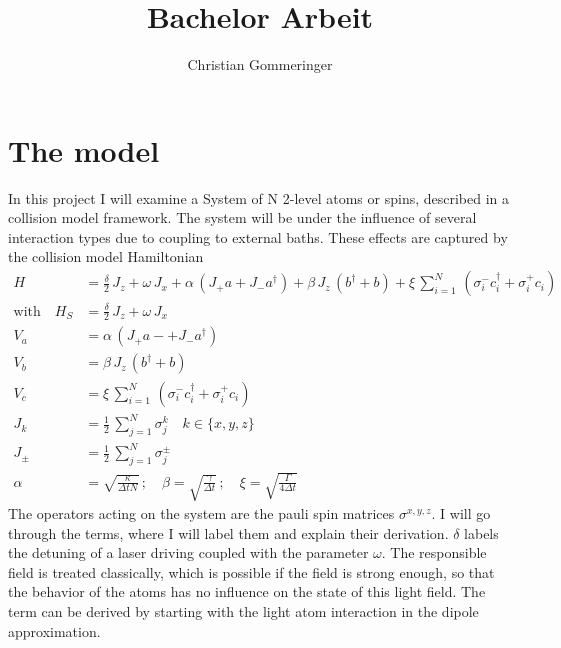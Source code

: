 \documentclass{article}
\title{Bachelor Arbeit}
\author{Christian Gommeringer}
\begin{document}
\newcommand{\half}{\frac{1}{2}}
\newcommand{\Tr}{\operatorname{Tr}}
\newcommand{\Trs}[1]{\Tr_S\left\{#1\right\}}
\newcommand{\Trb}[1]{\Tr_B\left\{#1\right\}}
\newcommand{\dt}{\frac{\text{d}}{\text{d}t}}
\newcommand{\tk}{\tilde{\kappa}}
\newcommand{\tw}{\tilde{\omega}}
\newcommand{\dkw}{\left(\frac{\text{d}}{\text{d}{y}}\,\frac{\Omega^2}{K}\right)}
\newcommand{\kw}{\frac{\Omega^2}{K}}
\newcommand{\ty}{\tilde{y}}
\newcommand{\diff}{\text{d}}
\maketitle


\section{The model}
In this project I will examine a System of N 2-level atoms or spins, described in a collision model framework\cite{ciccarello_cm,cm_source2}. The system will be under the influence of several interaction types due to coupling to external baths. These effects are captured by the collision model Hamiltonian 
\begin{align*}
    H &= \frac{\delta}{2}\,J_z+ \omega\,J_x+\alpha\,(J_+a + J_-a^\dagger)+ \beta\,J_z\,(b^\dagger+b)+\xi\,\sum_{i=1}^N\,(\sigma_i^-c_i^\dagger+\sigma_i^+c_i)\\
    \text{with}\quad H_S&=\frac{\delta}{2}\,J_z+ \omega\,J_x\\
    V_a&=\alpha\,(J_+a- + J_-a^\dagger)\\
    V_b&=\beta\,J_z\,(b^\dagger+b)\\
    V_c&=\xi\,\sum_{i=1}^N\,(\sigma_i^-c_i^\dagger+\sigma_i^+c_i)\\
    J_k &=\half\,\sum_{j=1}^N\sigma_j^k\quad k\in\{x,y,z\}\\
    J_\pm&=\half\,\sum_{j=1}^N\sigma_j^\pm\\
    \alpha&=\sqrt{\frac{\kappa}{\Delta tN}}\,;\quad \beta=\sqrt{\frac{\gamma}{\Delta t}}\,;\quad \xi=\sqrt{\frac{\Gamma}{4\Delta t}}
\end{align*}
The operators acting on the system are the pauli spin matrices $\sigma^{x,y,z}$. I will go through the terms, where I will label them and explain their derivation. $\delta$ labels the detuning of a laser driving coupled with the parameter $\omega$. The responsible field is treated classically, which is possible if the field is strong enough, so that the behavior of the atoms has no influence on the state of this light field. The term can be derived by starting with the light atom interaction in the dipole approximation.
\end{document}
